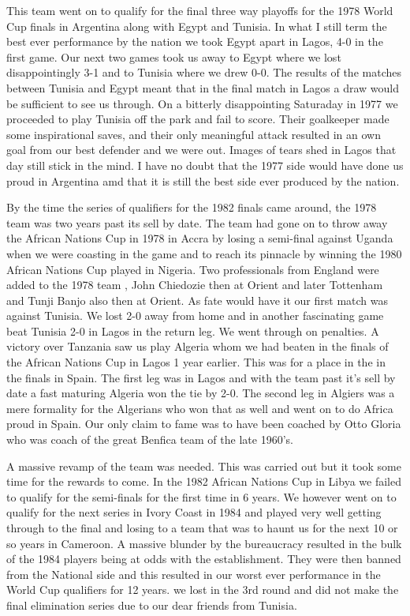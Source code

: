 This team went on to qualify for the final three way playoffs for the 1978 
World Cup finals in Argentina along with Egypt and Tunisia. In what I still 
term the best ever performance by the nation we took Egypt apart in Lagos, 4-0
in the first game. Our next two games took us away to Egypt where we lost 
disappointingly 3-1 and to Tunisia where we drew 0-0. The results of the 
matches between Tunisia and Egypt meant that in the final match in Lagos a draw 
would be sufficient to see us through. On a bitterly disappointing Saturaday in 
1977 we proceeded to play Tunisia off the park and fail to score. Their 
goalkeeper made some inspirational saves, and their only meaningful attack 
resulted in an own goal from our best defender and we were out. Images of tears 
shed in Lagos that day still stick in the mind. I have no doubt that the 1977 
side would have done us proud in Argentina amd that it is still the best side 
ever produced by the nation.

By the time the series of qualifiers for the 1982 finals came around, the 1978
team was two years past its sell by date. The team had gone on to throw away 
the African Nations Cup in 1978 in Accra by losing a semi-final against Uganda
when we were coasting in the game and to reach its pinnacle by winning the 1980
African Nations Cup played in Nigeria. Two professionals from England were 
added to the 1978 team , John Chiedozie then at Orient and later Tottenham and
Tunji Banjo also then at Orient. As fate would have it our first match was 
against Tunisia. We lost 2-0 away from home and in another fascinating game 
beat Tunisia 2-0 in Lagos in the return leg. We went through on penalties. A 
victory over Tanzania saw us play Algeria whom we had beaten in the finals of 
the African Nations Cup in Lagos 1 year earlier. This was for a place in the 
in the finals in Spain. The first leg was in Lagos and with the team past it's
sell by date a fast maturing Algeria won the tie by 2-0. The second leg in 
Algiers was a mere formality for the Algerians who won that as well and went on
to do Africa proud in Spain. Our only claim to fame was to have been coached by
Otto Gloria who was coach of the great Benfica team of the late 1960's.

A massive revamp of the team was needed. This was carried out but it took some 
time for the rewards to come. In the 1982 African Nations Cup in Libya we 
failed to qualify for the semi-finals for the first time in 6 years. We however
went on to qualify for the next series in Ivory Coast in 1984 and played very 
well getting through to the final and losing to a team that was to haunt us 
for the next 10 or so years in Cameroon. A massive blunder by the bureaucracy 
resulted in the bulk of the 1984 players being at odds with the establishment. 
They were then banned from the National side and this resulted in our worst 
ever performance in the World Cup qualifiers for 12 years. we lost in the 3rd 
round and did not make the final elimination series due to our dear friends 
from Tunisia.

